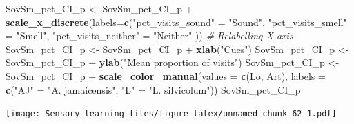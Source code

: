 \documentclass[]{article}
\newenvironment{Shaded}{\begin{snugshade}}{\end{snugshade}}
\newcommand{\KeywordTok}[1]{\textcolor[rgb]{0.13,0.29,0.53}{\textbf{{#1}}}}
\newcommand{\DataTypeTok}[1]{\textcolor[rgb]{0.13,0.29,0.53}{{#1}}}
\newcommand{\StringTok}[1]{\textcolor[rgb]{0.31,0.60,0.02}{{#1}}}
\newcommand{\CommentTok}[1]{\textcolor[rgb]{0.56,0.35,0.01}{\textit{{#1}}}}
\newcommand{\NormalTok}[1]{{#1}}
\begin{document}
\begin{Shaded}
\begin{Highlighting}[]
\NormalTok{SovSm_pct_CI_p <-}\StringTok{ }\NormalTok{SovSm_pct_CI_p +}\StringTok{ }\KeywordTok{scale_x_discrete}\NormalTok{(}\DataTypeTok{labels=}\KeywordTok{c}\NormalTok{(}\StringTok{"pct_visits_sound"} \NormalTok{=}\StringTok{ "Sound"}\NormalTok{, }\StringTok{"pct_visits_smell"} \NormalTok{=}\StringTok{ "Smell"}\NormalTok{,}
                              \StringTok{"pct_visits_neither"} \NormalTok{=}\StringTok{ "Neither"} \NormalTok{))  }\CommentTok{# Relabelling X axis}
\NormalTok{SovSm_pct_CI_p <-}\StringTok{ }\NormalTok{SovSm_pct_CI_p +}\StringTok{ }\KeywordTok{xlab}\NormalTok{(}\StringTok{"Cues"}\NormalTok{)}
\NormalTok{SovSm_pct_CI_p <-}\StringTok{ }\NormalTok{SovSm_pct_CI_p +}\StringTok{ }\KeywordTok{ylab}\NormalTok{(}\StringTok{"Mean proportion of visits"}\NormalTok{)}
\NormalTok{SovSm_pct_CI_p <-}\StringTok{ }\NormalTok{SovSm_pct_CI_p +}\StringTok{  }\KeywordTok{scale_color_manual}\NormalTok{(}\DataTypeTok{values =} \KeywordTok{c}\NormalTok{(Lo, Art), }\DataTypeTok{labels =} \KeywordTok{c}\NormalTok{(}\StringTok{"AJ"} \NormalTok{=}\StringTok{ "A. jamaicensis"}\NormalTok{, }\StringTok{"L"} \NormalTok{=}\StringTok{ "L. silvicolum"}\NormalTok{))}
\NormalTok{SovSm_pct_CI_p                    }
\end{Highlighting}
\end{Shaded}

\texttt{[image: Sensory\_learning\_files/figure-latex/unnamed-chunk-62-1.pdf]}
\end{document}
